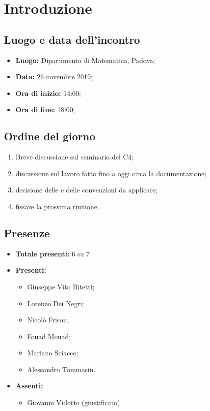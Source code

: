 \section*{Introduzione}

\subsection*{Luogo e data dell'incontro}
	\begin{itemize}
		\item \textbf{Luogo:} Dipartimento di Matematica, Padova;
		\item \textbf{Data:} 26 novembre 2019;
		\item \textbf{Ora di inizio:} 14:00;
		\item \textbf{Ora di fine:} 18:00;
	\end{itemize}

\subsection*{Ordine del giorno}
	\begin{enumerate}
		\item Breve discussione sul seminario del  C4;
		\item discussione sul lavoro fatto fino a oggi circa la documentazione;
		\item decisione delle  e delle convenzioni da applicare;
		\item fissare la prossima riunione.
	\end{enumerate}

\subsection*{Presenze}
	\begin{itemize}
		\item \textbf{Totale presenti:} 6 su 7
		\item \textbf{Presenti: }
			\begin{itemize}
				\item Giuseppe Vito Bitetti;
				\item Lorenzo Dei Negri;
				\item Nicolò Frison;
				\item Fouad Mouad;
				\item Mariano Sciacco;
				\item Alessandro Tommasin.
			\end{itemize}
		\item \textbf{Assenti: }
			\begin{itemize}
				\item Giovanni Vidotto (giustificato).
			\end{itemize}
	\end{itemize}


